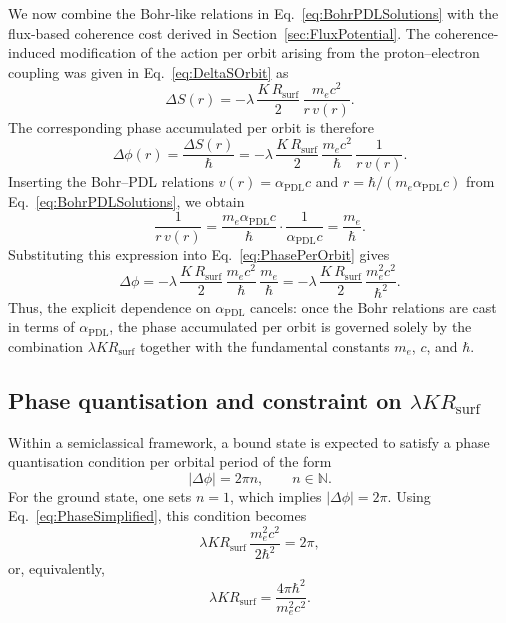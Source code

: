 \documentclass[11pt,a4paper]{article}
\begin{document}
We now combine the Bohr-like relations in Eq.~\eqref{eq:BohrPDLSolutions} with the flux-based coherence cost derived in Section~\ref{sec:FluxPotential}. The coherence-induced modification of the action per orbit arising from the proton--electron coupling was given in Eq.~\eqref{eq:DeltaSOrbit} as
\begin{equation}
\Delta S(r) = -\lambda\,\frac{K\,R_{\mathrm{surf}}}{2}\,\frac{m_e c^{2}}{r\,v(r)}.
\end{equation}
The corresponding phase accumulated per orbit is therefore
\begin{equation}
\Delta\phi(r) = \frac{\Delta S(r)}{\hbar} = -\lambda\,\frac{K\,R_{\mathrm{surf}}}{2}\,\frac{m_e c^{2}}{\hbar}\,\frac{1}{r\,v(r)}.
\label{eq:PhasePerOrbit}
\end{equation}
Inserting the Bohr--PDL relations $v(r) = \alpha_{\mathrm{PDL}} c$ and $r = \hbar/(m_e \alpha_{\mathrm{PDL}} c)$ from Eq.~\eqref{eq:BohrPDLSolutions}, we obtain
\begin{equation}
\frac{1}{r\,v(r)} = \frac{m_e \alpha_{\mathrm{PDL}} c}{\hbar} \cdot \frac{1}{\alpha_{\mathrm{PDL}} c} = \frac{m_e}{\hbar}.
\end{equation}
Substituting this expression into Eq.~\eqref{eq:PhasePerOrbit} gives
\begin{equation}
\Delta\phi = -\lambda\,\frac{K\,R_{\mathrm{surf}}}{2}\,\frac{m_e c^{2}}{\hbar}\,\frac{m_e}{\hbar} = -\lambda\,\frac{K\,R_{\mathrm{surf}}}{2}\,\frac{m_e^{2} c^{2}}{\hbar^{2}}.
\label{eq:PhaseSimplified}
\end{equation}
Thus, the explicit dependence on $\alpha_{\mathrm{PDL}}$ cancels: once the Bohr relations are cast in terms of $\alpha_{\mathrm{PDL}}$, the phase accumulated per orbit is governed solely by the combination $\lambda K R_{\mathrm{surf}}$ together with the fundamental constants $m_e$, $c$, and $\hbar$.

\subsection{Phase quantisation and constraint on \texorpdfstring{$\lambda K R_{\mathrm{surf}}$}{lambda K Rsurf}}

Within a semiclassical framework, a bound state is expected to satisfy a phase quantisation condition per orbital period of the form
\begin{equation}
|\Delta\phi| = 2\pi n, \qquad n \in \mathbb{N}.
\end{equation}
For the ground state, one sets $n = 1$, which implies $|\Delta\phi| = 2\pi$. Using Eq.~\eqref{eq:PhaseSimplified}, this condition becomes
\begin{equation}
\lambda K R_{\mathrm{surf}}\,\frac{m_e^{2} c^{2}}{2\hbar^{2}} = 2\pi,
\end{equation}
or, equivalently,
\begin{equation}
\lambda K R_{\mathrm{surf}} = \frac{4\pi \hbar^{2}}{m_e^{2} c^{2}}.
\label{eq:lambdaKConstraint}
\end{equation}
\end{document}
